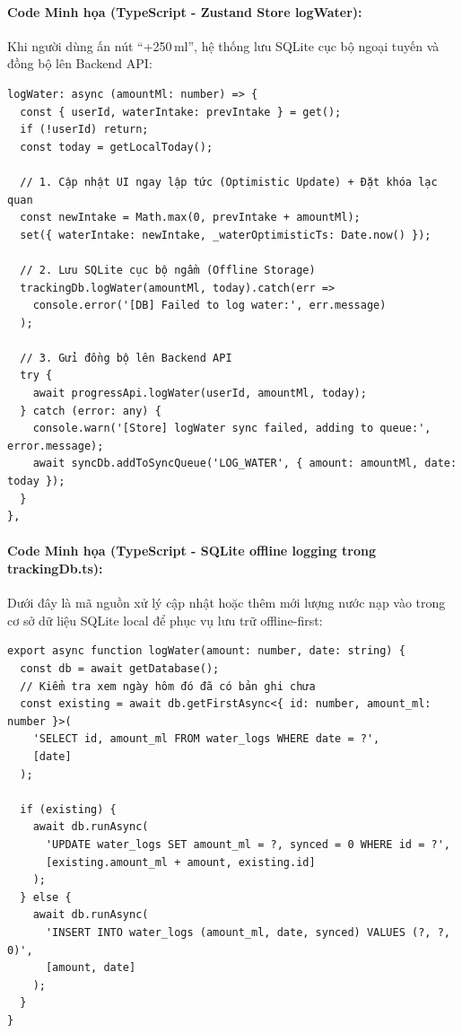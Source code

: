 \documentclass[12pt,a4paper]{article}
\begin{document}
\paragraph{Code Minh họa (TypeScript - Zustand Store logWater):}
Khi người dùng ấn nút ``+250\,ml'', hệ thống lưu SQLite cục bộ ngoại tuyến và đồng bộ lên Backend API:
\begin{verbatim}
logWater: async (amountMl: number) => {
  const { userId, waterIntake: prevIntake } = get();
  if (!userId) return;
  const today = getLocalToday();

  // 1. Cập nhật UI ngay lập tức (Optimistic Update) + Đặt khóa lạc quan
  const newIntake = Math.max(0, prevIntake + amountMl);
  set({ waterIntake: newIntake, _waterOptimisticTs: Date.now() });

  // 2. Lưu SQLite cục bộ ngầm (Offline Storage)
  trackingDb.logWater(amountMl, today).catch(err => 
    console.error('[DB] Failed to log water:', err.message)
  );

  // 3. Gửi đồng bộ lên Backend API
  try {
    await progressApi.logWater(userId, amountMl, today);
  } catch (error: any) {
    console.warn('[Store] logWater sync failed, adding to queue:', error.message);
    await syncDb.addToSyncQueue('LOG_WATER', { amount: amountMl, date: today });
  }
},
\end{verbatim}

\paragraph{Code Minh họa (TypeScript - SQLite offline logging trong trackingDb.ts):}
Dưới đây là mã nguồn xử lý cập nhật hoặc thêm mới lượng nước nạp vào trong cơ sở dữ liệu SQLite local để phục vụ lưu trữ offline-first:
\begin{verbatim}
export async function logWater(amount: number, date: string) {
  const db = await getDatabase();
  // Kiểm tra xem ngày hôm đó đã có bản ghi chưa
  const existing = await db.getFirstAsync<{ id: number, amount_ml: number }>(
    'SELECT id, amount_ml FROM water_logs WHERE date = ?',
    [date]
  );

  if (existing) {
    await db.runAsync(
      'UPDATE water_logs SET amount_ml = ?, synced = 0 WHERE id = ?',
      [existing.amount_ml + amount, existing.id]
    );
  } else {
    await db.runAsync(
      'INSERT INTO water_logs (amount_ml, date, synced) VALUES (?, ?, 0)',
      [amount, date]
    );
  }
}
\end{verbatim}
\end{document}
